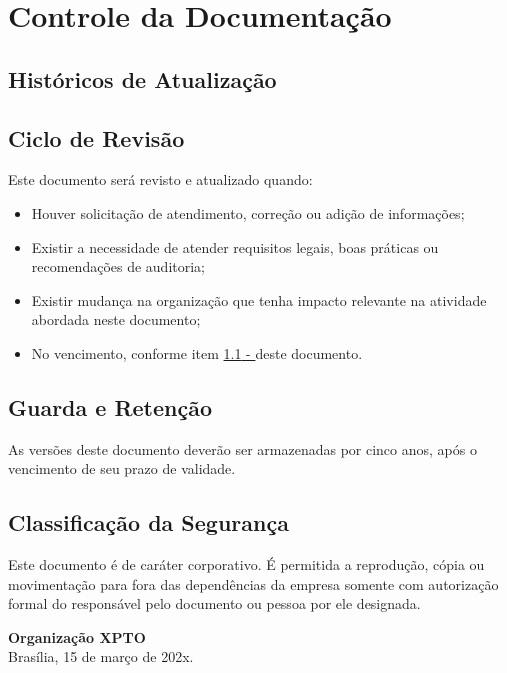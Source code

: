 \documentclass[a4paper,12pt]{article}
\begin{document}
\section{Controle da Documentação}

\subsection{Históricos de Atualização}
\label{sec:historico_de_atualizacao}



\subsection{Ciclo de Revisão}

Este documento será revisto e atualizado quando:

\begin{itemize}
    \item Houver solicitação de atendimento, correção ou adição de informações;
    \item Existir a necessidade de atender requisitos legais, boas práticas ou recomendações de auditoria;
    \item Existir mudança na organização que tenha impacto relevante na atividade abordada neste documento;
    \item No vencimento, conforme item \hyperref[sec:historico_de_atualizacao]{\ref{sec:historico_de_atualizacao} - } deste documento.
\end{itemize}

\subsection{Guarda e Retenção}

As versões deste documento deverão ser armazenadas por cinco anos, após o vencimento de seu prazo de validade.

\subsection{Classificação da Segurança}

Este documento é de caráter corporativo. É permitida a reprodução, cópia ou movimentação para fora das dependências da empresa somente com autorização formal do responsável pelo documento ou pessoa por ele designada.

\vspace{2cm}

\noindent
\textbf{Organização XPTO} \\
Brasília, 15 de março de 202x.
\end{document}
